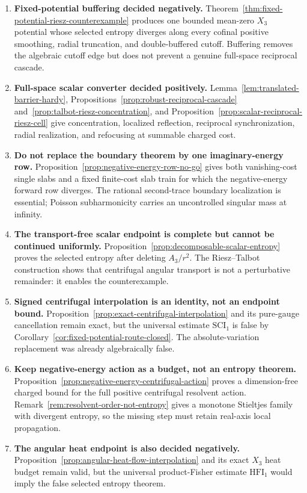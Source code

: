 \documentclass[11pt]{article}
\theoremstyle{definition}
\theoremstyle{remark}
\begin{document}
\begin{enumerate}[label=\textbf{Stage \arabic*.},leftmargin=*]
 \item \textbf{Fixed-potential buffering decided negatively.}  Theorem~\ref{thm:fixed-potential-riesz-counterexample} produces one bounded mean-zero $X_3$ potential whose selected entropy diverges along every cofinal positive smoothing, radial truncation, and double-buffered cutoff.  Buffering removes the algebraic cutoff edge but does not prevent a genuine full-space reciprocal cascade.
 \item \textbf{Full-space scalar converter decided positively.}  Lemma~\ref{lem:translated-barrier-hardy}, Propositions~\ref{prop:robust-reciprocal-cascade} and~\ref{prop:talbot-riesz-concentration}, and Proposition~\ref{prop:scalar-reciprocal-riesz-cell} give concentration, localized reflection, reciprocal synchronization, radial realization, and refocusing at summable charged cost.
 \item \textbf{Do not replace the boundary theorem by one imaginary-energy row.}  Proposition~\ref{prop:negative-energy-row-no-go} gives both vanishing-cost single slabs and a fixed finite-cost slab train for which the negative-energy forward row diverges.  The rational second-trace boundary localization is essential; Poisson subharmonicity carries an uncontrolled singular mass at infinity.
 \item \textbf{The transport-free scalar endpoint is complete but cannot be continued uniformly.}  Proposition~\ref{prop:decomposable-scalar-entropy} proves the selected entropy after deleting $A_3/r^2$.  The Riesz--Talbot construction shows that centrifugal angular transport is not a perturbative remainder: it enables the counterexample.
 \item \textbf{Signed centrifugal interpolation is an identity, not an endpoint bound.}  Proposition~\ref{prop:exact-centrifugal-interpolation} and its pure-gauge cancellation remain exact, but the universal estimate $\mathrm{SCI}_1$ is false by Corollary~\ref{cor:fixed-potential-route-closed}.  The absolute-variation replacement was already algebraically false.
 \item \textbf{Keep negative-energy action as a budget, not an entropy theorem.}  Proposition~\ref{prop:negative-energy-centrifugal-action} proves a dimension-free charged bound for the full positive centrifugal resolvent action.  Remark~\ref{rem:resolvent-order-not-entropy} gives a monotone Stieltjes family with divergent entropy, so the missing step must retain real-axis local propagation.
 \item \textbf{The angular heat endpoint is also decided negatively.}  Proposition~\ref{prop:angular-heat-flow-interpolation} and its exact $X_3$ heat budget remain valid, but the universal product-Fisher estimate $\mathrm{HFI}_1$ would imply the false selected entropy theorem.

\end{enumerate}
\end{document}
